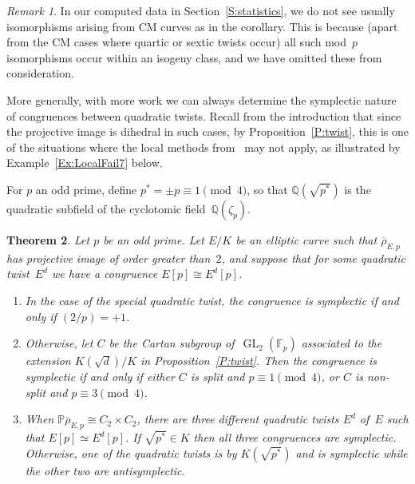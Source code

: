 \documentclass[12pt, reqno]{amsart}
\newcommand{\F}{\mathbb{F}}
\newcommand{\PP}{\mathbb{P}}
\newcommand{\Q}{\mathbb{Q}}
\newcommand{\rhobar}{{\overline{\rho}}}
\newcommand{\GL}{\operatorname{GL}}
\numberwithin{equation}{section}
\newtheorem{theorem}{Theorem}[section]
\theoremstyle{definition}
\theoremstyle{remark}
\newtheorem{remark}[theorem]{Remark}
\begin{document}
\begin{remark}
In our computed data in Section~\ref{S:statistics}, we do not see
usually isomorphisms arising from CM curves as in the corollary. This
is because (apart from the CM cases where quartic or sextic twists
occur) all such mod~$p$ isomorphisms occur within an isogeny class,
and we have omitted these from consideration.
\end{remark}

More generally, with more work we can always determine the symplectic
nature of congruences between quadratic twists.  Recall from the
introduction that since the projective image is dihedral in such
cases, by Proposition~\ref{P:twist}, this is one of the situations where
the local methods from~\cite{FKSym} may not apply, as illustrated by
Example~\ref{Ex:LocalFail7} below.

For $p$ an odd prime, define $p^*=\pm p\equiv1\pmod4$, so that
$\Q(\sqrt{p^*})$ is the quadratic subfield of the cyclotomic
field~$\Q(\zeta_p)$.

\begin{theorem} \label{T:Cartan}
Let $p$ be an odd prime. Let $E/K$ be an elliptic curve such that
$\rhobar_{E,p}$ has projective image of order greater than~$2$, and
suppose that for some quadratic twist~$E^d$ we have a congruence
$E[p]\cong E^d[p]$.
\begin{enumerate}
\item In the case of the special quadratic twist, the congruence is
  symplectic if and only if $(2/p)=+1$.

\item Otherwise, let $C$ be the Cartan subgroup of~$\GL_2(\F_p)$
  associated to the extension $K(\sqrt{d})/K$ in
  Proposition~\ref{P:twist}.  Then the congruence is symplectic if and
  only if \emph{either} $C$ is split and $p \equiv 1 \pmod{4}$,
  \emph{or} $C$ is non-split and $p \equiv 3 \pmod{4}$.

\item When $\PP\rhobar_{E,p}\cong C_2\times C_2$, there are three
  different quadratic twists $E^{d}$ of~$E$ such that $E[p] \simeq
  E^{d}[p]$.  If $\sqrt{p^*}\in K$ then all three congruences are
  symplectic.  Otherwise, one of the quadratic twists is by
  $K(\sqrt{p^*})$ and is symplectic while the other two are
  antisymplectic.
\end{enumerate}
\end{theorem}
\end{document}
